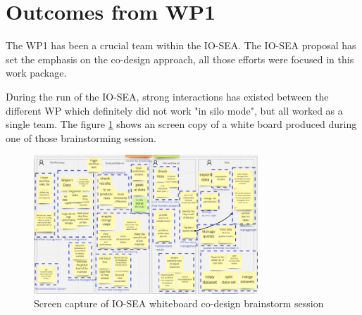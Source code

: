 \section{Outcomes from WP1}

The WP1 has been a crucial team within the IO-SEA. The IO-SEA proposal has set the emphasis on the co-design
approach, all those efforts were focused in this work package. 

During the run of the IO-SEA, strong interactions has existed between the different WP which definitely did not
work "in silo mode", but all worked as a single team. The figure \ref{fig:white-board} shows an screen copy
of a white board produced during one of those brainstorming session. 

\begin{figure}[H]
    \centering
    \includegraphics[width=0.75\textwidth]{FIGS/white-board.png}
    \caption[Co-design whiteboard]{ Screen capture of IO-SEA whiteboard co-design brainstorm session}
    \label{fig:white-board}
\end{figure}

